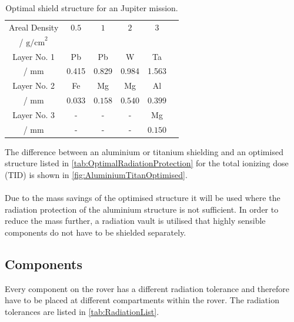 \begin{table}
\centering
\caption{Optimal shield structure for an Jupiter mission. \cite{Platzhalter}}
\begin{adjustbox}{max width=\textwidth}
\begin{tabular}[l]{cccccc}

	\toprule
	
	Areal Density	&	\(0.5\)	&	\(1\) &  \(2\) & \(3\)	\\
	/ \(\text{g/cm}^2\)	&	&	&  & \\
	
	\midrule
	
	
	Layer No. 1	&	Pb &  Pb & W	& Ta	\\
	/ mm	&	0.415 &  0.829 & 0.984	& 1.563	\\
	
	
	Layer No. 2	&	Fe	&  Mg &	Mg & Al \\
	/ mm	&	\(0.033\)	&  \(0.158\) &	\(0.540\) & \(0.399\) \\
	
	
	Layer No. 3 &	-	&  -	& - & Mg \\
	/ mm &	-	&  -	& - & \(0.150\) \\
	

	\bottomrule

\end{tabular}
\end{adjustbox}
\label{tab:OptimalRadiationProtection}
\end{table}

The difference between an aluminium or titanium shielding and an optimised structure listed in \autoref{tab:OptimalRadiationProtection} for the total ionizing dose (TID) is shown in \autoref{fig:AluminiumTitanOptimised}. \\ \\
Due to the mass savings of the optimised structure it will be used where the radiation protection of the aluminium structure is not sufficient. In order to reduce the mass further, a radiation vault is utilised that highly sensible components do not have to be shielded separately.

\subsection{Components}


Every component on the rover has a different radiation tolerance and therefore have to be placed at different compartments within the rover. The radiation tolerances are listed in \autoref{tab:RadiationList}.

